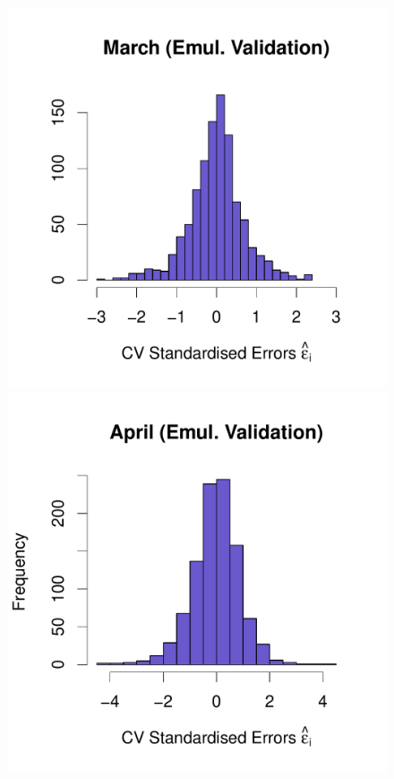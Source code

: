 \documentclass[a4paper, 12pt]{article}
\begin{document}
\begin{figure}
 \includegraphics[width=\scale]{Emulator_CV/Histograms/March_CV_Errors_Hist}\\[-1ex]
 \includegraphics[width=\scale]{Emulator_CV/Histograms/April_CV_Errors_Hist}\hspace{-3ex}

\end{figure}
\end{document}

